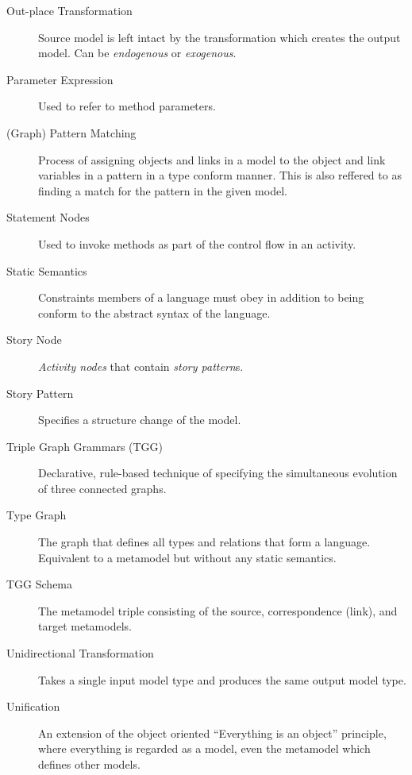 \begin{description}
\item[Out-place Transformation] Source model is left intact by the transformation which creates the output model. Can be \emph{endogenous} or \emph{exogenous}.

\item[Parameter Expression]
Used to refer to method parameters.

\item[(Graph) Pattern Matching]
Process of assigning objects and links in a model to the object and link variables in a pattern in a type conform manner. This is also reffered to as finding a
match for the pattern in the given model.

\item[Statement Nodes]
Used to invoke methods as part of the control flow in an activity.

\item[Static Semantics] 
Constraints members of a language must obey in addition to being conform to the abstract syntax of the language.

\item[Story Node]
\emph{Activity nodes} that contain \emph{story pattern}s.

\item[Story Pattern]
Specifies a structure change of the model.

\item[Triple Graph Grammars (TGG)] 
Declarative, rule-based technique of specifying the simultaneous evolution of three connected graphs.

\item[Type Graph] 
The graph that defines all types and relations that form a language. Equivalent to a metamodel but without any static semantics.

\item[TGG Schema] 
The metamodel triple consisting of the source, correspondence (link), and target metamodels.

\item[Unidirectional Transformation] Takes a single input model type and produces the same output model type.

\item[Unification]  
An extension of the object oriented ``Everything is an object'' principle, where everything is regarded as a model, even the metamodel which defines other
models.

\end{description}
